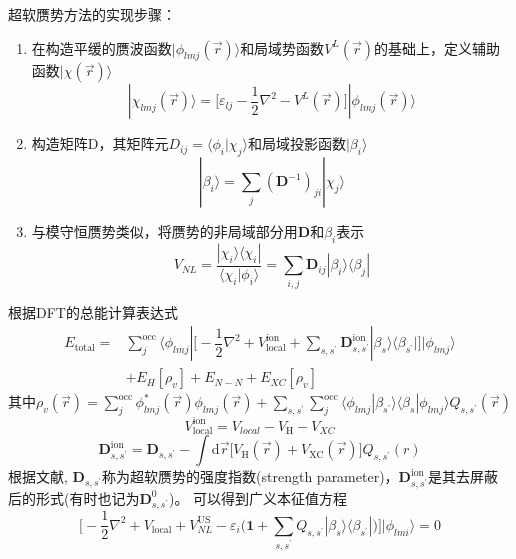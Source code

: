 {超软赝势方法的实现步骤：
\begin{enumerate}
	\item 在构造平缓的赝波函数$|\phi_{lmj}(\vec r)\rangle$和局域势函数$V^L(\vec r)$的基础上，定义辅助函数$|\chi(\vec r)\rangle$
\begin{equation}
	|\chi_{lmj}(\vec r)\rangle=\bigg[\varepsilon_{lj}-\dfrac12\nabla^2-V^L(\vec r)\bigg]|\phi_{lmj}(\vec r)\rangle
  \label{eq:uspp_1}
\end{equation}
	\item 构造矩阵$\mathrm{D}$，其矩阵元$D_{ij}=\langle\phi_i|\chi_j\rangle$和局域投影函数$|\beta_i\rangle$
\begin{equation}
	|\beta_i\rangle=\sum_j(\mathbf{D}^{-1})_{ji}|\chi_{j}\rangle
  \label{eq:uspp_2}
\end{equation}
	\item 与模守恒赝势类似，将赝势的非局域部分用$\mathbf{D}$和$\beta_i$表示
\begin{equation}
	V_{NL}=\dfrac{|\chi_i\rangle\langle\chi_i|}{\langle\chi_i|\phi_i\rangle}=\sum_{i,j}\mathbf{D}_{ij}|\beta_i\rangle\langle\beta_j|
  \label{eq:uspp_3}
\end{equation}
\end{enumerate}
根据DFT的总能计算表达式
	\begin{equation} 
		\begin{aligned}
			E_{\mathrm{total}}=&\sum_j^{\mathrm{occ}}\langle\phi_{lmj}|\bigg[-\dfrac12\nabla^2+V_{\mathrm{local}}^{\mathrm{ion}}+\sum_{s,s^{\prime}}\mathbf{D}_{s,s^{\prime}}^{\mathrm{ion}}|\beta_s\rangle\langle\beta_{s^{\prime}}|\bigg]|\phi_{lmj}\rangle\\
			&+E_{H}[\rho_v]+E_{N-N}+E_{XC}[\rho_v]
		\end{aligned}
  \label{eq:uspp_5}
	\end{equation}
其中$\rho_v(\vec r)=\sum\limits_j^{\mathrm{occ}}\phi_{lmj}^{\ast}(\vec r)\phi_{lmj}(\vec r)+\sum\limits_{s,s^{\prime}}\sum\limits_j^{\mathrm{occ}}\langle\phi_{lmj}|\beta_{s^{\prime}}\rangle\langle\beta_s|\phi_{lmj}\rangle Q_{s,s^{\prime}}(\vec r)$
	$$V_{\mathrm{local}}^{\mathrm{ion}}=V_{local}-V_{\mathrm H}-V_{XC}$$
	\begin{equation}
		\mathbf{D}_{s,s^{\prime}}^{\mathrm{ion}}=\mathbf{D}_{s,s^{\prime}}-\int\mathrm{d}\vec r\big[V_{\mathrm{H}}(\vec r)+V_{\mathrm{XC}}(\vec r)\big]Q_{s,s^{\prime}}(r)
		\label{eq:uspp_6}
	\end{equation}
根据文献, $\mathbf{D}_{s,s^{\prime}}$称为超软赝势的强度指数(\textrm{strength parameter})，$\mathbf{D}_{s,s^{\prime}}^{\mathrm{ion}}$是其去屏蔽后的形式(有时也记为$\mathbf{D}_{s,s^{\prime}}^0$)。
可以得到广义本征值方程
\begin{equation}
	\bigg[-\dfrac12\nabla^2+V_{\mathrm{local}}+V_{NL}^{\mathrm{US}}-\varepsilon_i\bigg(\mathbf{1}+\sum_{s,s^{\prime}}Q_{s,s^{\prime}}|\beta_s\rangle\langle\beta_{s^{\prime}}|\bigg)\bigg]|\phi_{lmi}\rangle=0
	\label{eq:uspp_7}
\end{equation}

}

